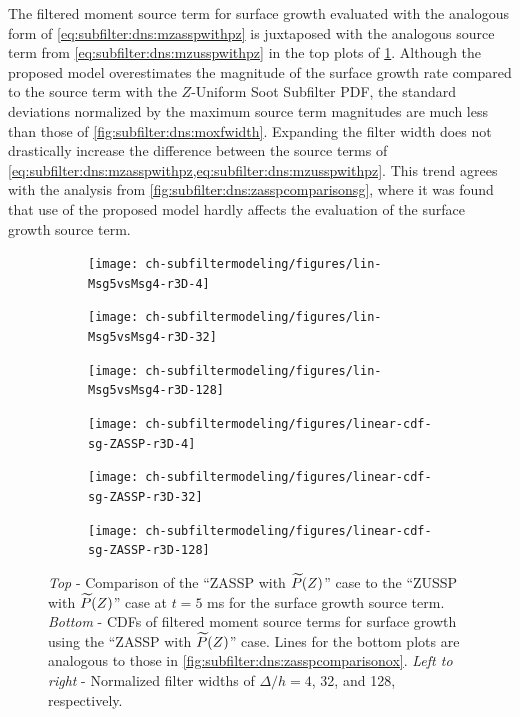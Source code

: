 The filtered moment source term for surface growth evaluated with the analogous form of \cref{eq:subfilter:dns:mzasspwithpz} is juxtaposed with the analogous source term from \cref{eq:subfilter:dns:mzusspwithpz} in the top plots of \cref{fig:subfilter:dns:msgfwidth}. Although the proposed model overestimates the magnitude of the surface growth rate compared to the source term with the $Z$-Uniform Soot Subfilter PDF, the standard deviations normalized by the maximum source term magnitudes are much less than those of \cref{fig:subfilter:dns:moxfwidth}. Expanding the filter width does not drastically increase the difference between the source terms of \cref{eq:subfilter:dns:mzasspwithpz,eq:subfilter:dns:mzusspwithpz}. This trend agrees with the analysis from \cref{fig:subfilter:dns:zasspcomparisonsg}, where it was found that use of the proposed model hardly affects the evaluation of the surface growth source term. %

\begin{figure}[ht]
  \centering
  \begin{subfigure}[b]{0.33\linewidth}
    \centering
    \texttt{[image: ch-subfiltermodeling/figures/lin-Msg5vsMsg4-r3D-4]}
  \end{subfigure}%
  \begin{subfigure}[b]{0.33\linewidth}
    \centering
    \texttt{[image: ch-subfiltermodeling/figures/lin-Msg5vsMsg4-r3D-32]}
  \end{subfigure}%
  \begin{subfigure}[b]{0.33\linewidth}
    \centering
    \texttt{[image: ch-subfiltermodeling/figures/lin-Msg5vsMsg4-r3D-128]}
  \end{subfigure}
  \begin{subfigure}[b]{0.33\linewidth}
    \centering
    \texttt{[image: ch-subfiltermodeling/figures/linear-cdf-sg-ZASSP-r3D-4]}
  \end{subfigure}%
  \begin{subfigure}[b]{0.33\linewidth}
    \centering
    \texttt{[image: ch-subfiltermodeling/figures/linear-cdf-sg-ZASSP-r3D-32]}
  \end{subfigure}%
  \begin{subfigure}[b]{0.33\linewidth}
    \centering
    \texttt{[image: ch-subfiltermodeling/figures/linear-cdf-sg-ZASSP-r3D-128]}
  \end{subfigure}
  \caption[\texorpdfstring{$\fst[M]{1,0}^{sg}$}{M1,0sg} Using ZASSP with $\pz$ for Various \texorpdfstring{$\Delta/h$}{D/h}]{\textit{Top} - Comparison of the ``ZASSP with $\pz$'' case to the ``ZUSSP with $\pz$'' case at $t = 5$ ms for the surface growth source term. \textit{Bottom} - CDFs of filtered moment source terms for surface growth using the ``ZASSP with $\pz$'' case. Lines for the bottom plots are analogous to those in \cref{fig:subfilter:dns:zasspcomparisonox}. \textit{Left to right} - Normalized filter widths of $\Delta/h = 4$, 32, and 128, respectively.}
  \label{fig:subfilter:dns:msgfwidth}
\end{figure}
